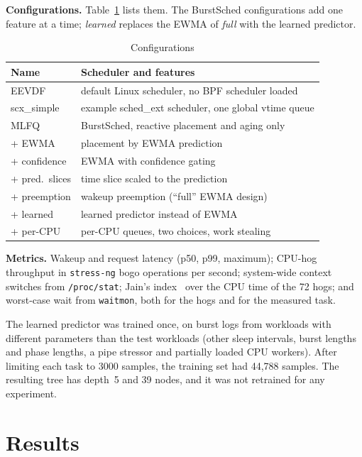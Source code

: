 \documentclass[conference]{IEEEtran}
\newcommand{\code}[1]{\texttt{\small #1}}
\begin{document}
\textbf{Configurations.} Table~\ref{tab:configs} lists them. The BurstSched configurations add
one feature at a time; \emph{learned} replaces the EWMA of \emph{full} with the learned
predictor.

\begin{table}[t]
\caption{Configurations}
\label{tab:configs}
\centering
\footnotesize
\begin{tabular}{@{}lp{5.05cm}@{}}
\toprule
Name & Scheduler and features \\
\midrule
EEVDF & default Linux scheduler, no BPF scheduler loaded \\
scx\_simple & example sched\_ext scheduler, one global vtime queue \\
MLFQ & BurstSched, reactive placement and aging only \\
+ EWMA & placement by EWMA prediction \\
+ confidence & EWMA with confidence gating \\
+ pred.\ slices & time slice scaled to the prediction \\
+ preemption & wakeup preemption (``full'' EWMA design) \\
+ learned & learned predictor instead of EWMA \\
+ per-CPU & per-CPU queues, two choices, work stealing \\
\bottomrule
\end{tabular}
\end{table}

\textbf{Metrics.} Wakeup and request latency (p50, p99, maximum); CPU-hog throughput in
\code{stress-ng} bogo operations per second; system-wide context switches from
\code{/proc/stat}; Jain's index~\cite{jain} over the CPU time of the 72 hogs; and worst-case
wait from \code{waitmon}, both for the hogs and for the measured task.

The learned predictor was trained once, on burst logs from workloads with different parameters
than the test workloads (other sleep intervals, burst lengths and phase lengths, a pipe stressor
and partially loaded CPU workers). After limiting each task to 3000 samples, the training set had
44{,}788 samples. The resulting tree has depth~5 and 39 nodes, and it was not retrained for any
experiment.

\section{Results}\label{sec:results}
\end{document}
